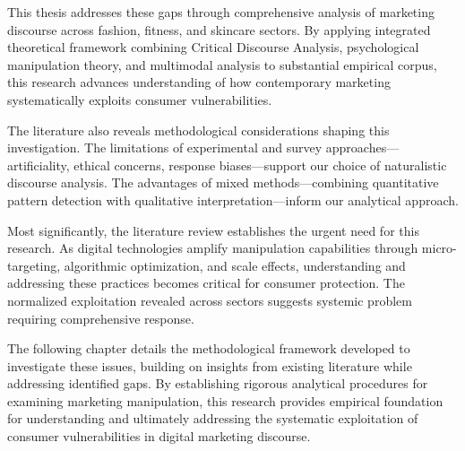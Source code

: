 This thesis addresses these gaps through comprehensive analysis of marketing discourse across fashion, fitness, and skincare sectors. By applying integrated theoretical framework combining Critical Discourse Analysis, psychological manipulation theory, and multimodal analysis to substantial empirical corpus, this research advances understanding of how contemporary marketing systematically exploits consumer vulnerabilities.

The literature also reveals methodological considerations shaping this investigation. The limitations of experimental and survey approaches—artificiality, ethical concerns, response biases—support our choice of naturalistic discourse analysis. The advantages of mixed methods—combining quantitative pattern detection with qualitative interpretation—inform our analytical approach.

Most significantly, the literature review establishes the urgent need for this research. As digital technologies amplify manipulation capabilities through micro-targeting, algorithmic optimization, and scale effects, understanding and addressing these practices becomes critical for consumer protection. The normalized exploitation revealed across sectors suggests systemic problem requiring comprehensive response.

The following chapter details the methodological framework developed to investigate these issues, building on insights from existing literature while addressing identified gaps. By establishing rigorous analytical procedures for examining marketing manipulation, this research provides empirical foundation for understanding and ultimately addressing the systematic exploitation of consumer vulnerabilities in digital marketing discourse.